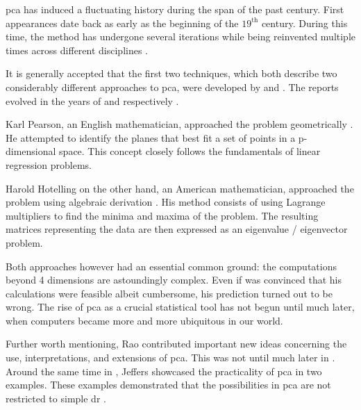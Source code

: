 \Gls{pca} has induced a fluctuating history during the span of the past century.
First appearances date back as early as the beginning of the $19^{\text{th}}$ century. 
During this time, the method has undergone several iterations while being reinvented multiple times across different disciplines \cite{jolliffe2016principal}.\bigskip


It is generally accepted that the first two techniques, which both describe two considerably different approaches to \gls{pca}, were developed by \citeauthor{pearson1901liii} and \citeauthor{hotelling1933analysis}. 
The reports evolved in the years of \citeyear{pearson1901liii} and \citeyear{hotelling1933analysis} respectively \cite{Jolliffe2002book}.

Karl Pearson, an English mathematician, approached the problem geometrically \cite{pearson1901liii}.
He attempted to identify the planes that best fit a set of points in a p-dimensional space.
This concept closely follows the fundamentals of linear regression problems.

Harold Hotelling on the other hand, an American mathematician, approached the problem using algebraic derivation \cite{hotelling1933analysis}.
His method consists of using Lagrange multipliers to find the minima and maxima of the problem.
The resulting matrices representing the data are then expressed as an eigenvalue / eigenvector problem.\medskip


Both approaches however had an essential common ground: the computations beyond 4 dimensions are astoundingly complex.
Even if \citeauthor{pearson1901liii} was convinced that his calculations were feasible albeit cumbersome, his prediction turned out to be wrong.
The rise of \gls{pca} as a crucial statistical tool has not begun until much later, when computers became more and more ubiquitous in our world.\bigskip


Further worth mentioning, Rao \cite{rao1964use} contributed important new ideas concerning the use, interpretations, and extensions of \gls{pca}.
This was not until much later in \citeyear{rao1964use}.
Around the same time in \citeyear{jeffers1967two}, Jeffers \cite{jeffers1967two} showcased the practicality of \gls{pca} in two examples. 
These examples demonstrated that the possibilities in \gls{pca} are not restricted to simple \acrlong{dr} \cite{Jolliffe2002book}.



